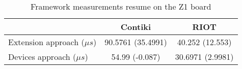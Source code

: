 \begin{table}[!ht]
  \centering
  \begin{tabular}{l|c|c}
                      & Contiki           & RIOT             \\ \hline
  Extension approach ($\mu s$) & 90.5761 (35.4991) & 40.252 (12.553)       \\
  Devices approach ($\mu s$)   & 54.99 (-0.087)  & 30.6971 (2.9981)
  \end{tabular}
  \caption{Framework measurements resume on the Z1 board}
  \label{tab:framework-measurements-resume-z1}
  \end{table}